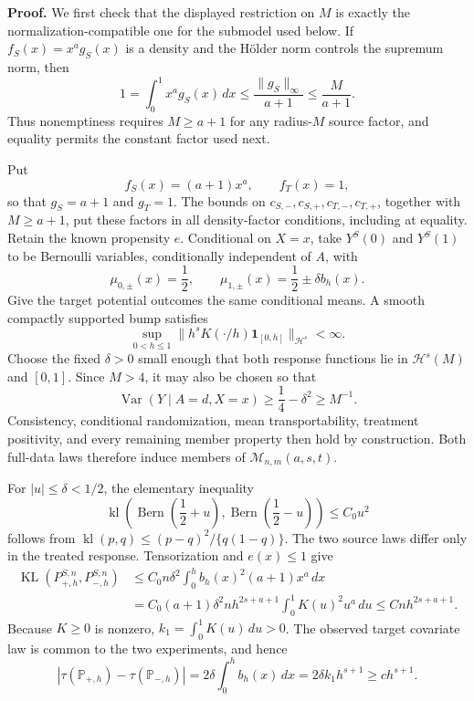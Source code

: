 \textbf{Proof.}
We first check that the displayed restriction on \(M\) is exactly the normalization-compatible one for the submodel used below.  If \(f_S(x)=x^ag_S(x)\) is a density and the Hölder norm controls the supremum norm, then
\[
 1=\int_0^1x^ag_S(x)\,dx
 \le \frac{\lVert g_S\rVert_\infty}{a+1}
 \le \frac{M}{a+1}.
\]
Thus nonemptiness requires \(M\ge a+1\) for any radius-\(M\) source factor, and equality permits the constant factor used next.

Put
\[
 f_S(x)=(a+1)x^a,\qquad f_T(x)=1,
\]
so that \(g_S=a+1\) and \(g_T=1\).  The bounds on \(c_{S,-},c_{S,+},c_{T,-},c_{T,+}\), together with \(M\ge a+1\), put these factors in all density-factor conditions, including at equality.  Retain the known propensity \(e\).  Conditional on \(X=x\), take \(Y^S(0)\) and \(Y^S(1)\) to be Bernoulli variables, conditionally independent of \(A\), with
\[
 \mu_{0,\pm}(x)=\frac12,
 \qquad
 \mu_{1,\pm}(x)=\frac12\pm\delta b_h(x).
\]
Give the target potential outcomes the same conditional means.  A smooth compactly supported bump satisfies
\[
 \sup_{0<h\le1}\lVert h^sK(\cdot/h)\mathbf 1_{[0,h]}\rVert_{\mathcal H^s}<\infty.
\]
Choose the fixed \(\delta>0\) small enough that both response functions lie in \(\mathcal H^s(M)\) and \([0,1]\).  Since \(M>4\), it may also be chosen so that
\[
 \operatorname{Var}(Y\mid A=d,X=x)
 \ge \frac14-\delta^2\ge M^{-1}.
\]
Consistency, conditional randomization, mean transportability, treatment positivity, and every remaining member property then hold by construction.  Both full-data laws therefore induce members of \(\mathcal M_{n,m}(a,s,t)\).

For \(|u|\le\delta<1/2\), the elementary inequality
\[
 \operatorname{kl}\!\left(\operatorname{Bern}\left(\frac12+u\right),
 \operatorname{Bern}\left(\frac12-u\right)\right)
 \le C_0u^2
\]
follows from \(\operatorname{kl}(p,q)\le(p-q)^2/\{q(1-q)\}\).  The two source laws differ only in the treated response.  Tensorization and \(e(x)\le1\) give
\[
\begin{aligned}
 \operatorname{KL}(P_{+,h}^{S,n},P_{-,h}^{S,n})
 &\le C_0n\delta^2\int_0^hb_h(x)^2(a+1)x^a\,dx\\
 &=C_0(a+1)\delta^2nh^{2s+a+1}
   \int_0^1K(u)^2u^a\,du
 \le Cnh^{2s+a+1}.
\end{aligned}
\]
Because \(K\ge0\) is nonzero, \(k_1=\int_0^1K(u)\,du>0\).  The observed target covariate law is common to the two experiments, and hence
\[
 |\tau(\mathbb P_{+,h})-\tau(\mathbb P_{-,h})|
 =2\delta\int_0^hb_h(x)\,dx
 =2\delta k_1h^{s+1}\ge ch^{s+1}.
\]

